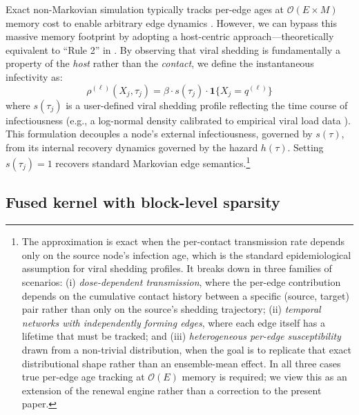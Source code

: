 \documentclass[a4paper,fleqn]{cas-sc}
\theoremstyle{definition}
\theoremstyle{remark}
\newcommand{\bigO}{\mathcal{O}}
\begin{document}
Exact non-Markovian simulation typically tracks per-edge ages at $\mathcal{O}(E \times M)$ memory cost to enable arbitrary edge dynamics \citep{boguna2014simulating}. However, we can bypass this massive memory footprint by adopting a host-centric approach—theoretically equivalent to ``Rule 2'' in \citet{boguna2014simulating}. By observing that viral shedding is fundamentally a property of the \emph{host} rather than the \emph{contact}, we define the instantaneous infectivity as:
\begin{equation}
    \rho^{(\ell)}(X_j, \tau_j) = \beta \cdot s(\tau_j) \cdot \mathbf{1}\{X_j = q^{(\ell)}\}
    \label{eq:infectivity}
\end{equation}
where $s(\tau_j)$ is a user-defined viral shedding profile reflecting the time course of infectiousness (e.g., a log-normal density calibrated to empirical viral load data \citep{he2020temporal}). This formulation decouples a node's external infectiousness, governed by $s(\tau)$, from its internal recovery dynamics governed by the hazard $h(\tau)$. Setting $s(\tau_j) = 1$ recovers standard Markovian edge semantics.\footnote{The approximation is exact when the per-contact transmission rate depends only on the source node's infection age, which is the standard epidemiological assumption for viral shedding profiles. It breaks down in three families of scenarios: (i) \emph{dose-dependent transmission}, where the per-edge contribution depends on the cumulative contact history between a specific (source, target) pair rather than only on the source's shedding trajectory; (ii) \emph{temporal networks with independently forming edges}, where each edge itself has a lifetime that must be tracked; and (iii) \emph{heterogeneous per-edge susceptibility} drawn from a non-trivial distribution, when the goal is to replicate that exact distributional shape rather than an ensemble-mean effect. In all three cases true per-edge age tracking at $\bigO(E)$ memory is required; we view this as an extension of the renewal engine rather than a correction to the present paper.}

\subsection{Fused kernel with block-level sparsity}
\label{sec:fused_kernel}
\end{document}
